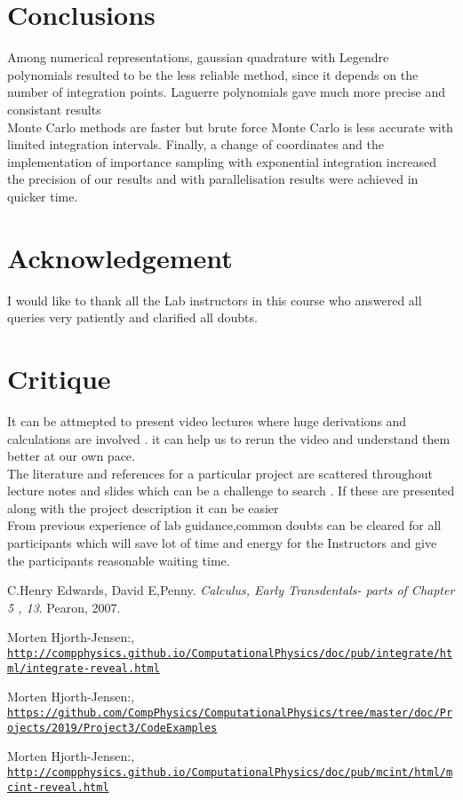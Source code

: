 \documentclass[9pt,a4paper,titlepage]{article}
\begin{document}
\section{Conclusions}
Among numerical representations, gaussian quadrature with Legendre polynomials resulted to be the less reliable method, since it depends  on the number of integration points. 
Laguerre polynomials gave much more precise  and consistant results 
\\ Monte Carlo methods are faster but brute force Monte Carlo is less accurate with limited integration intervals. 
Finally, a change of coordinates and the implementation of importance sampling with exponential integration increased the precision of our results and with parallelisation results were achieved in quicker time.

\section{Acknowledgement}
I would like to thank all the Lab instructors in this course who answered all queries very patiently and clarified all doubts.

\section{Critique}
It can be attmepted to present video lectures where huge  derivations and calculations are involved . it can help us to rerun the video and understand them better at our own pace.
\\ The literature and references for a particular project are scattered throughout lecture notes and slides which can be a challenge to search . If these are presented along with the project description it can be easier
\\ From previous experience of lab guidance,common doubts can be cleared for all participants which will save lot of time and energy for the Instructors and give the participants reasonable waiting time.
\medskip
 
\begin{thebibliography}{9}
C.Henry Edwards, David E,Penny. 
\textit{Calculus, Early Transdentals- parts of Chapter 5 , 13}. 
Pearon, 2007.

Morten Hjorth-Jensen:,
\\\texttt{\url{http://compphysics.github.io/ComputationalPhysics/doc/pub/integrate/html/integrate-reveal.html}}

Morten Hjorth-Jensen:,
\\\texttt{\url{https://github.com/CompPhysics/ComputationalPhysics/tree/master/doc/Projects/2019/Project3/CodeExamples}}

Morten Hjorth-Jensen:,
\\\texttt{\url{http://compphysics.github.io/ComputationalPhysics/doc/pub/mcint/html/mcint-reveal.html}}


\end{thebibliography}
\end{document}
